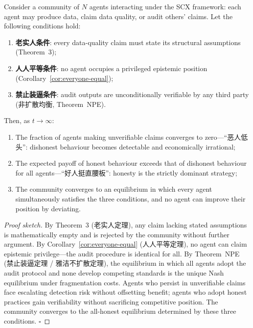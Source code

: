 \begin{theorem}
\label{thm:good-convergence}
Consider a community of $N$ agents interacting under the SCX framework:
each agent may produce data, claim data quality, or audit others' claims.
Let the following conditions hold:
\begin{enumerate}[label=(C\arabic*)]
  \item \textbf{老实人条件}: every data-quality claim must state its
    structural assumptions (Theorem~3);
  \item \textbf{人人平等条件}: no agent occupies a privileged epistemic
    position (Corollary~\ref{cor:everyone-equal});
  \item \textbf{禁止装逼条件}: audit outputs are unconditionally verifiable
    by any third party (非扩散均衡, Theorem~NPE).
\end{enumerate}
Then, as $t\to\infty$:
\begin{enumerate}[label=(\roman*)]
  \item The fraction of agents making unverifiable claims converges to
    zero---``恶人低头'': dishonest behaviour becomes detectable and
    economically irrational;
  \item The expected payoff of honest behaviour exceeds that of dishonest
    behaviour for all agents---``好人挺直腰板'': honesty is the strictly
    dominant strategy;
  \item The community converges to an equilibrium in which every agent
    simultaneously satisfies the three conditions, and no agent can improve
    their position by deviating.
\end{enumerate}
\end{theorem}

\begin{proof}[Proof sketch]
By Theorem~3 (老实人定理), any claim lacking stated assumptions is
mathematically empty and is rejected by the community without further
argument. By Corollary~\ref{cor:everyone-equal} (人人平等定理), no agent
can claim epistemic privilege---the audit procedure is identical for all.
By Theorem~NPE (禁止装逼定理 / 雅洁不扩散定理), the equilibrium in which
all agents adopt the audit protocol and none develop competing standards
is the unique Nash equilibrium under fragmentation costs. Agents who
persist in unverifiable claims face escalating detection risk without
offsetting benefit; agents who adopt honest practices gain verifiability
without sacrificing competitive position. The community converges to the
all-honest equilibrium determined by these three conditions. $\square$
\end{proof}

